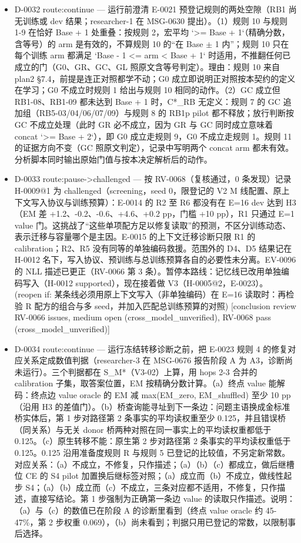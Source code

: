 \documentclass[11pt]{article}
\begin{document}
\begin{itemize}
\item D-0032 route:continue --- 运行前澄清 E-0021 预登记规则的两处空隙（RB1 尚无训练或 dev 结果；researcher-1 在 MSG-0630 提出）。（1）规则 10 与规则 1-9 在恰好 Base + 1 处重叠：按规则 2，宏平均 `\textgreater{}= Base + 1`（精确分数，含等号）的 arm 是有效的，不算规则 10 的``在 Base \ensuremath{\pm} 1 内''；规则 10 只在每个训练 arm 都满足 `Base - 1 \textless{}= arm \textless{} Base + 1` 时适用，不推翻任何已成立的门（G0、GR、GC、GL 照原文含等号判定）。理由：规则 10 来自 plan2 §7.4，前提是连正对照都学不动；G0 成立即说明正对照按本契约的定义在学习；G0 不成立时规则 1 给出与规则 10 相同的动作。（2）GC 成立但 RB1-08、RB1-09 都未达到 Base + 1 时，C*\_RB 无定义：规则 7 的 GC 追加组（RB5-03/04/06/07/09）与规则 8 的 RB1p pilot 都不释放；放行判断按 GC 不成立处理（此时 GR 必不成立，因为 GR 与 GC 同时成立意味着 concat `\textgreater{}= Base + 2`），即 G0 成立走规则 9，G0 不成立走规则 1。规则 11 的证据方向不变（GC 照原文判定），记录中写明两个 concat arm 都未有效。分析脚本同时输出原始门值与按本决定解析后的动作。
\item D-0033 route:pause-\textgreater{}challenged --- 按 RV-0068（复核通过，0 条发现）记录 H-0009@1 为 challenged（screening，seed 0，限登记的 V2 M 线配置、原上下文写入协议与训练预算）：E-0014 的 R2 至 R6 都没有在 E=16 dev 达到 H3（EM 差 +1.2、-0.2、-0.6、+4.6、+0.2 pp，门槛 +10 pp），R1 只通过 E=1 value 门。这挑战了``这些单项配方足以修复读取''的预测，不区分训练动态、表示迁移与容量哪个是主因。E-0015 的上下文迁移诊断只限 R1 的 calibration；R2、R5 没有同等的单独编码救援。范围外的 D4、D5 结果记在 H-0012 名下，写入协议、预训练与总训练预算各自的必要性未分离。EV-0096 的 NLL 描述已更正（RV-0066 第 3 条）。暂停本路线：记忆线已改用单独编码写入（H-0012 supported），现在接着做 V3（H-0005@2，E-0023）。 (reopen if: 某条线必须用原上下文写入（非单独编码）在 E=16 读取时：再检验 R 配方的组合与多 seed，并加入匹配总训练预算的对照) [conclusion review RV-0066 issues, medium open (cross\_model\_unverified), RV-0068 pass (cross\_model\_unverified)]
\item D-0034 route:continue --- 运行冻结转移诊断之前，把 E-0023 规则 4 的修复对应关系定成数值判据（researcher-3 在 MSG-0676 报告阶段 A 为 A3，诊断尚未运行）。三个判据都在 S\_M*（V3-02）上算，用 hops 2-3 合并的 calibration 子集，取答案位置，EM 按精确分数计算。（a）终点 value 能解码：终点边 value oracle 的 EM 减 max(EM\_zero, EM\_shuffled) 至少 10 pp（沿用 H3 的差值门）。（b）桥查询能寻址到下一条边：问题主语换成金标准桥实体后，第 1 步对路径第 2 条事实的平均读权重至少 0.125，并且错误桥（同关系）与无关 donor 桥两种对照在同一事实上的平均读权重都低于 0.125。（c）原生转移不能：原生第 2 步对路径第 2 条事实的平均读权重低于 0.125。0.125 沿用准备度规则 R 与规则 5 已登记的比较值，不另定新常数。对应关系：（a）不成立，不修复，只作描述；（a）（b）（c）都成立，做后继槽位 CE 的 S4 pilot 加置换后继标签对照；（a）成立而（b）不成立，做线性起步 S4；（a）（b）成立而（c）不成立，三条对应都不适用，不修复，只作描述，直接写结论。第 1 步强制为正确第一条边 value 的读取只作描述。说明：（a）与（c）的数值已在阶段 A 的诊断里看到（终点 value oracle 约 45-47\%，第 2 步权重 0.069），（b）尚未看到；判据只用已登记的常数，以限制事后选择。

\end{itemize}
\end{document}

